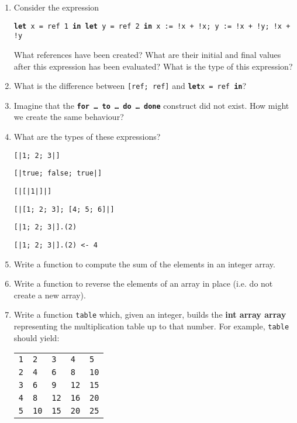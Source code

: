 \documentclass[]{book}
\newcommand{\plet}{\textbf{let}\xspace}
\newcommand{\pin}{\textbf{in}\xspace}
\begin{document}
\begin{enumerate}
  \item Consider the expression
  
  \texttt{\textbf{let} x = ref 1 \textbf{in} \textbf{let} y = ref 2 \textbf{in} x := !x + !x; y := !x + !y; !x + !y}
  
  What references have been created? What are their initial and final values after this expression has been evaluated? What is the type of this expression? 
  \item What is the difference between \texttt{[ref;\! ref]} and \texttt{\plet \!x\! =\! ref\! \pin \![x;\! x]}? 
    
  \item Imagine that the \texttt{\textbf{for\! \!\ldots\ \!to \!\ldots\ \!do \!\ldots\ \!done}} construct did not exist. How might we create the same behaviour?
  
  \item What are the types of these expressions?
  
  \texttt{[|1; 2; 3|]}
  
  \texttt{[|true; false; true|]}
  
  \texttt{[|[|1|]|]}
  
  \texttt{[|[1; 2; 3]; [4; 5; 6]|]}
  
  \texttt{[|1; 2; 3|].(2)}
  
  \texttt{[|1; 2; 3|].(2) <- 4}
  
  \item Write a function to compute the sum of the elements in an integer array.
  
  \item Write a function to reverse the elements of an array in place (i.e. do not create a new array).
  
  \item Write a function \texttt{table} which, given an integer, builds the \textbf{\textsf{int array array}} representing the multiplication table up to that number. For example, \texttt{table} should yield:

\vspace{2mm}  
\noindent\begin{tabular}{@{}lllll@{}}
 \verb!1! & \verb!2! & \verb!3! & \verb!4! & \verb!5!\\
 \verb!2! & \verb!4! & \verb!6! & \verb!8! & \verb!10!\\
 \verb!3! & \verb!6! & \verb!9! & \verb!12! & \verb!15!\\
 \verb!4! & \verb!8! & \verb!12! & \verb!16! & \verb!20!\\
 \verb!5! & \verb!10! & \verb!15! & \verb!20! & \verb!25!
\end{tabular}
\vspace{2mm}


\end{enumerate}
\end{document}

